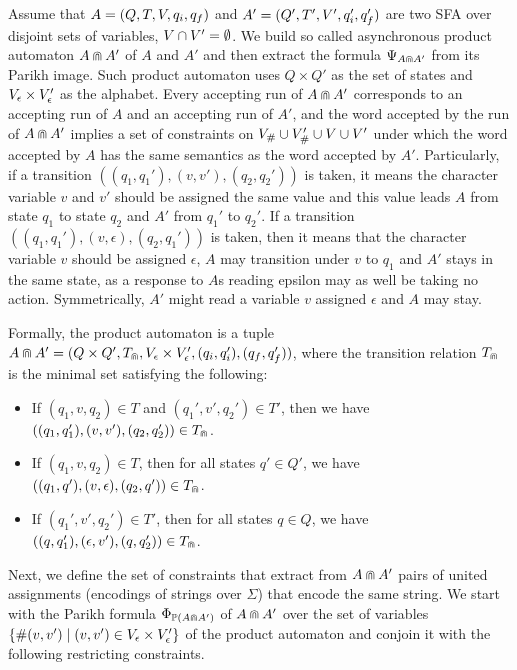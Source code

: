\documentclass[sigplan,review,anonymous]{acmart}\settopmatter{printfolios=true,printccs=false,printacmref=false}
\begin{document}
Assume that $A = (Q,T,V,q_i,q_f)$ and ${A'} = (Q',T',V',q_i',q_f')$ are two SFA over disjoint sets of variables, $V \cap V' = \emptyset$. 
We build so called asynchronous product automaton $A \Cap A'$ of $A$ and ${A'}$ and then extract the formula $\Psi_{A \Cap A'}$ from its Parikh image.
%
Such product automaton uses $Q\times Q'$ as the set of states and 
$V_\epsilon\times V'_\epsilon$
as the alphabet. 
%
Every accepting run of $A \Cap A'$  corresponds to an accepting run of $A$ and an accepting run of ${A'}$, and the word accepted by the run of $A \Cap A'$ implies a set of constraints on $V_\#\cup V'_\#\cup V\cup V'$ under which the word accepted by $A$ has the same semantics as the word accepted by ${A'}$.
%
Particularly, if a transition $((q_1,q_1'), (v,v'),(q_2,q_2'))$ is taken, it means the character variable $v$ and $v'$ should be assigned the same value and this value leads $A$ from state $q_1$ to state $q_2$ and ${A'}$ from $q_1'$ to $q_2'$.
%
If a transition $((q_1,q_1'), (v,\epsilon),(q_2,q_1'))$ is taken, then it means that the character variable $v$ should be assigned $\epsilon$, $A$ may transition under $v$ to $q_1$ and ${A'}$ stays in the same state, as a response to $A$s reading epsilon may as well be taking no action. Symmetrically, ${A'}$ might read a variable $v$ assigned $\epsilon$ and $A$ may stay.

Formally, the product automaton is a tuple $A \Cap A' = (Q\times Q', T_\Cap, V_\epsilon \times V'_\epsilon, (q_i,q_i'),(q_f,q_f'))$, where the transition relation $T_\Cap$ is the minimal set satisfying the following:
%
\begin{itemize}
\item If $(q_1,v,q_2) \in T$ and $(q_1',v',q_2') \in T'$, then we have $((q_1,q_1'),(v,v'),(q_2,q_2'))\in T_\Cap$.
\item If $(q_1,v,q_2) \in T$, then for all states $q'\in Q'$, we have $((q_1,q'),(v,\epsilon),(q_2,q'))\in T_\Cap$.
\item If $(q_1',v',q_2') \in T'$, then for all states $q\in Q$, we have $((q,q_1'),(\epsilon,v'),(q,q_2'))\in T_\Cap$.
\end{itemize}	
%
Next, we define the set of constraints that extract from $A \Cap A'$ pairs of united assignments (encodings of strings over $\Sigma$) that encode the same string. 
We start with the Parikh formula $\Phi_{\mathbb{P}{(A \Cap A')}}$ of $A \Cap A'$ over the set of variables $\{\#(v,v')\mid (v,v') \in V_\epsilon \times V'_\epsilon\}$ of the product automaton and conjoin it with the following restricting constraints. 
\end{document}
